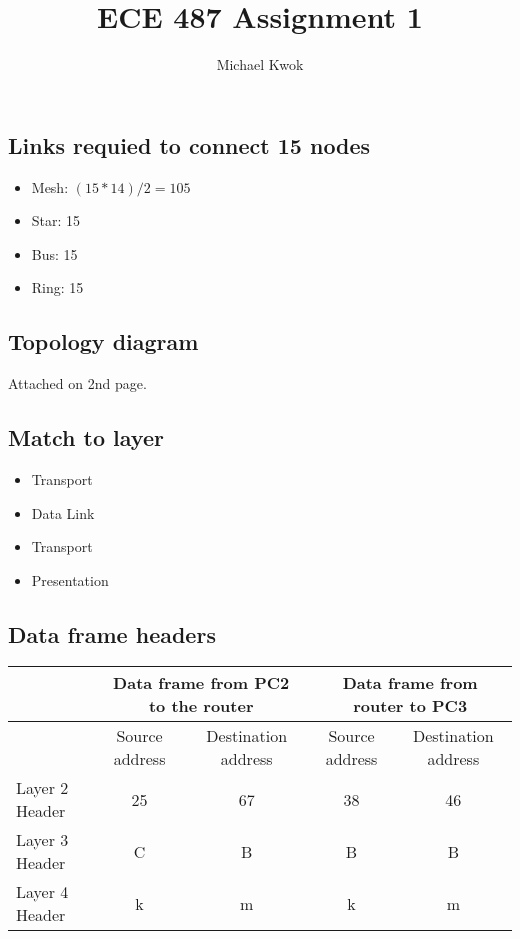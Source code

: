 \documentclass{article}
\title{ECE 487 Assignment 1}
\author{Michael Kwok}
\begin{document}
\maketitle
\subsection*{Links requied to connect 15 nodes}
\begin{itemize}
    \item Mesh: \((15 * 14) / 2 = 105\)
    \item Star: 15
    \item Bus: 15
    \item Ring: 15
\end{itemize}

\subsection*{Topology diagram}

Attached on 2nd page.

\subsection*{Match to layer}
\begin{itemize}
    \item Transport
    \item Data Link
    \item Transport
    \item Presentation
\end{itemize}

\subsection*{Data frame headers}
\begin{tabular}{ l  c  c  c  c }
    \toprule
                   & \multicolumn{2}{c}{Data frame from PC2 to the router} & \multicolumn{2}{c}{Data frame from router to PC3}                                        \\
    \midrule
                   & Source address                                        & Destination address                               & Source address & Destination address \\
    \midrule
    Layer 2 Header & 25                                                    & 67                                                & 38             & 46                  \\
    Layer 3 Header & C                                                     & B                                                 & B              & B                   \\
    Layer 4 Header & k                                                     & m                                                 & k              & m                   \\
    \bottomrule
\end{tabular}

\end{document}
